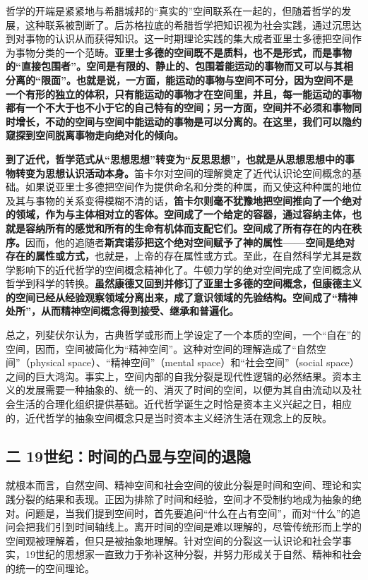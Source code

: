 \documentclass[UTF8, fontset = sourcesans, a4paper, oneside, zihao =
-4, scheme=chinese, no-math, space=true]{ctexbook}
\begin{document}
哲学的开端是紧紧地与希腊城邦的``真实的''空间联系在一起的，但随着哲学的发展，这种联系被割断了。后苏格拉底的希腊哲学把知识视为社会实践，通过沉思达到对事物的认识从而获得知识。这一时期理论实践的集大成者亚里士多德把空间作为事物分类的一个范畴。\textbf{亚里士多德的空间既不是质料，也不是形式，而是事物的``直接包围者''。空间是有限的、静止的、包围着能运动的事物而又可以与其相分离的``限面''。也就是说，一方面，能运动的事物与空间不可分，因为空间不是一个有形的独立的体积，只有能运动的事物才在空间里，并且，每一能运动的事物都有一个不大于也不小于它的自己特有的空间；另一方面，空间并不必须和事物同时增长，不动的空间与空间中能运动的事物是可以分离的。在这里，我们可以隐约窥探到空间脱离事物走向绝对化的倾向。}

\textbf{到了近代，哲学范式从``思想思想''转变为``反思思想''，也就是从思想思想中的事物转变为思想认识活动本身。}笛卡尔对空间的理解奠定了近代认识论空间概念的基础。如果说亚里士多德把空间作为提供命名和分类的种属，而又使这种种属的地位及其与事物的关系变得模糊不清的话，\textbf{笛卡尔则毫不犹豫地把空间推向了一个绝对的领域，作为与主体相对立的客体。空间成了一个给定的容器，通过容纳主体，也就是容纳所有的感觉和所有的生命有机体而支配它们。空间成了所有存在的内在秩序。}因而，他的追随者\textbf{斯宾诺莎把这个绝对空间赋予了神的属性------空间是绝对存在的属性或方式，}也就是，上帝的存在属性或方式。至此，在自然科学尤其是数学影响下的近代哲学的空间概念精神化了。牛顿力学的绝对空间完成了空间概念从哲学到科学的转换。\textbf{虽然康德又回到并修订了亚里士多德的空间概念，但康德主义的空间已经从经验观察领域分离出来，成了意识领域的先验结构。空间成了``精神处所''，从而精神空间概念得到接受、继承和普遍化。}

总之，列斐伏尔认为，古典哲学或形而上学设定了一个本质的空间，一个``自在''的空间，因而，空间被简化为``精神空间''。这种对空间的理解造成了``自然空间''（physical
space）、``精神空间''（mental space）和``社会空间''（social
space）之间的巨大鸿沟。事实上，空间内部的自我分裂是现代性逻辑的必然结果。资本主义的发展需要一种抽象的、统一的、消灭了时间的空间，以便为其自由流动以及社会生活的合理化组织提供基础。近代哲学诞生之时恰是资本主义兴起之日，相应的，近代哲学的抽象空间概念只是当时资本主义经济生活在观念上的反映。

\subsection{二
19世纪：时间的凸显与空间的退隐}\label{part0006_split_001.htmlux5cux23c014}

就根本而言，自然空间、精神空间和社会空间的彼此分裂是时间和空间、理论和实践分裂的结果和表现。正因为排除了时间和经验，空间才不受制约地成为抽象的绝对。问题是，当我们提到空间时，首先要追问``什么在占有空间''，而对``什么''的追问会把我们引到时间轴线上。离开时间的空间是难以理解的，尽管传统形而上学的空间观被理解着，但只是被抽象地理解。针对空间的分裂这一认识论和社会学事实，19世纪的思想家一直致力于弥补这种分裂，并努力形成关于自然、精神和社会的统一的空间理论。
\end{document}
